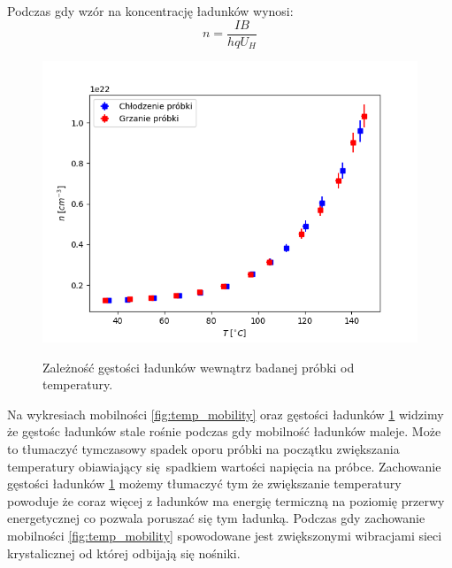 \documentclass[12pt]{article}
\begin{document}
Podczas gdy wzór na koncentrację ładunków wynosi:
\[
    n = \frac{IB}{hqU_H}
\]
\begin{figure}
    \centering
    \includegraphics[scale=0.5]{temp_concentration}
    \label{fig:temp_concentration}
    \caption{Zależność gęstości ładunków wewnątrz badanej próbki od temperatury.}
\end{figure}
Na wykresiach mobilności \ref{fig:temp_mobility} oraz gęstości ładunków \ref{fig:temp_concentration} widzimy że gęstośc ładunków stale rośnie podczas gdy mobilność ładunków maleje.
Może to tłumaczyć tymczasowy spadek oporu próbki na początku zwiększania temperatury obiawiający się spadkiem wartości napięcia na próbce.
Zachowanie gęstości ładunków \ref{fig:temp_concentration} możemy tłumaczyć tym że zwiększanie temperatury powoduje że coraz więcej z ładunków ma energię termiczną na poziomię przerwy energetycznej co pozwala poruszać się tym ładunką.
Podczas gdy zachowanie mobilności \ref{fig:temp_mobility} spowodowane jest zwiększonymi wibracjami sieci krystalicznej od której odbijają się nośniki.
\end{document}
